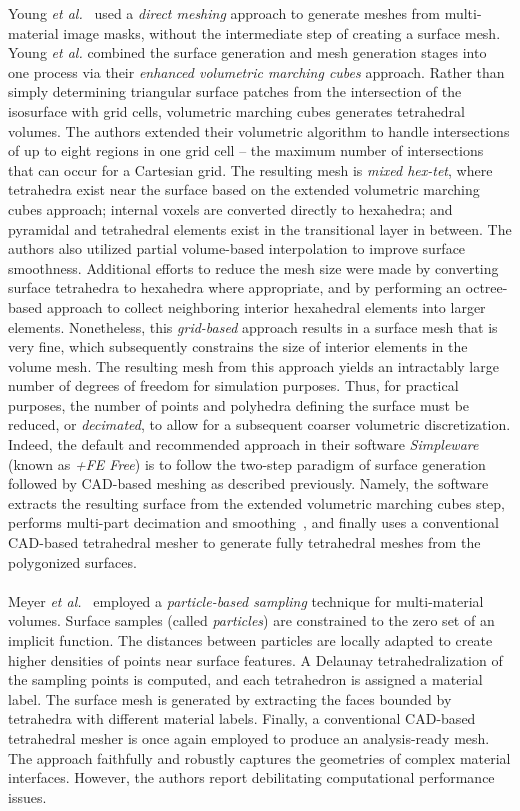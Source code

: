 %
Young \textit{et al.}~\cite{young_2008} used a \textit{direct meshing} approach to generate meshes from multi-material image masks, without the intermediate step of creating a surface mesh. Young \textit{et al.} combined the surface generation and mesh generation stages into one process via their \textit{enhanced volumetric marching cubes} approach. Rather than simply determining triangular surface patches from the intersection of the isosurface with grid cells, volumetric marching cubes generates tetrahedral volumes. The authors extended their volumetric algorithm to handle intersections of up to eight regions in one grid cell -- the maximum number of intersections that can occur for a Cartesian grid. The resulting mesh is \textit{mixed hex-tet}, where tetrahedra exist near the surface based on the extended volumetric marching cubes approach; internal voxels are converted directly to hexahedra; and pyramidal and tetrahedral elements exist in the transitional layer in between. The authors also utilized partial volume-based interpolation to improve surface smoothness. Additional efforts to reduce the mesh size were made by converting surface tetrahedra to hexahedra where appropriate, and by performing an octree-based approach to collect neighboring interior hexahedral elements into larger elements. Nonetheless, this \textit{grid-based} approach results in a surface mesh that is very fine, which subsequently constrains the size of interior elements in the volume mesh. The resulting mesh from this approach yields an intractably large number of degrees of freedom for simulation purposes. Thus, for practical purposes, the number of points and polyhedra defining the surface must be reduced, or \textit{decimated}, to allow for a subsequent coarser volumetric discretization. Indeed, the default and recommended approach in their software \textit{Simpleware} (known as \textit{+FE Free}) is to follow the two-step paradigm of surface generation followed by CAD-based meshing as described previously. Namely, the software extracts the resulting surface from the extended volumetric marching cubes step, performs multi-part decimation and smoothing~\cite{egst}, and finally uses a conventional CAD-based tetrahedral mesher to generate fully tetrahedral meshes from the polygonized surfaces. \\ \\
%
Meyer \textit{et al.}~\cite{meyer_2008} employed a \textit{particle-based sampling} technique for multi-material volumes. Surface samples (called \textit{particles}) are constrained to the zero set of an implicit function. The distances between particles are locally adapted to create higher densities of points near surface features. A Delaunay tetrahedralization of the sampling points is computed, and each tetrahedron is assigned a material label. The surface mesh is generated by extracting the faces bounded by tetrahedra with different material labels. Finally, a conventional CAD-based tetrahedral mesher is once again employed to produce an analysis-ready mesh. The approach faithfully and robustly captures the geometries of complex material interfaces. However, the authors report debilitating computational performance issues. \\ \\
